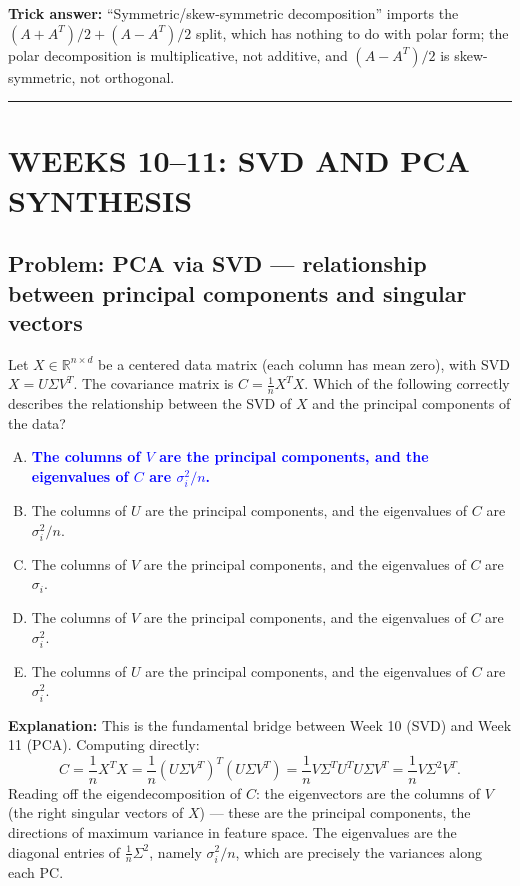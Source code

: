 \documentclass[12pt]{amsart}
\newcommand{\divider}{
  \vspace{-1em}
  \noindent
  \raisebox{-0.15ex}{\textbullet}%
  \hspace{0.5em}%
  \rule[0.5ex]{0.95\textwidth}{1.0pt}%
  \hspace{0.5em}%
  \raisebox{-0.15ex}{\textbullet}%
  \vspace{0em}
}
\begin{document}
\textbf{Trick answer:}
``Symmetric/skew-symmetric decomposition'' imports the
$(A + A^T)/2 + (A - A^T)/2$ split, which has nothing to do with polar form;
the polar decomposition is multiplicative, not additive, and $(A - A^T)/2$
is skew-symmetric, not orthogonal.

\divider

\section*{WEEKS 10--11: SVD AND PCA SYNTHESIS}

\subsection*{Problem: PCA via SVD --- relationship between principal components and singular vectors}

Let $X \in \mathbb{R}^{n \times d}$ be a centered data matrix (each column has
mean zero), with SVD $X = U \Sigma V^T$. The covariance matrix is
$C = \frac{1}{n} X^T X$. Which of the following correctly describes the
relationship between the SVD of $X$ and the principal components of the
data?

\begin{enumerate}[(A)]
    \item \textcolor{blue}{\textbf{The columns of $V$ are the principal components, and the eigenvalues of $C$ are $\sigma_i^2 / n$.}}
    \item The columns of $U$ are the principal components, and the eigenvalues of $C$ are $\sigma_i^2 / n$.
    \item The columns of $V$ are the principal components, and the eigenvalues of $C$ are $\sigma_i$.
    \item The columns of $V$ are the principal components, and the eigenvalues of $C$ are $\sigma_i^2$.
    \item The columns of $U$ are the principal components, and the eigenvalues of $C$ are $\sigma_i^2$.
\end{enumerate}

\textbf{Explanation:}
This is the fundamental bridge between Week 10 (SVD) and Week 11 (PCA).
Computing directly:
$$
C = \frac{1}{n} X^T X = \frac{1}{n} (U \Sigma V^T)^T (U \Sigma V^T)
= \frac{1}{n} V \Sigma^T U^T U \Sigma V^T
= \frac{1}{n} V \Sigma^2 V^T.
$$
Reading off the eigendecomposition of $C$: the eigenvectors are the columns
of $V$ (the right singular vectors of $X$) --- these are the principal
components, the directions of maximum variance in feature space. The
eigenvalues are the diagonal entries of $\frac{1}{n}\Sigma^2$, namely
$\sigma_i^2/n$, which are precisely the variances along each PC.
\end{document}
